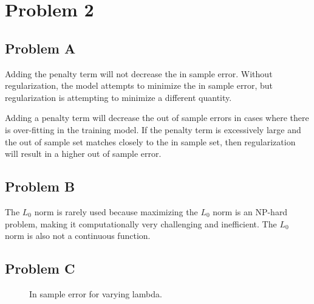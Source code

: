 \documentclass[12pt]{article} %
\begin{document}
\section{Problem 2}
\subsection{Problem A}
Adding the penalty term will not decrease the in sample error. Without regularization, the model attempts to minimize the in sample error, but regularization is attempting to minimize a different quantity. 

Adding a penalty term will decrease the out of sample errors in cases where there is over-fitting in the training model. If the penalty term is excessively large and the out of sample set matches closely to the in sample set, then regularization will result in a higher out of sample error.

\subsection{Problem B}
The $L_0$ norm is rarely used because maximizing the $L_0$ norm is an NP-hard problem, making it computationally very challenging and inefficient. The $L_0$ norm is also not a continuous function.

\subsection{Problem C}

\begin{figure}[H]
	\vspace{-10mm}
	\caption{In sample error for varying lambda.}
\end{figure}
\end{document}
